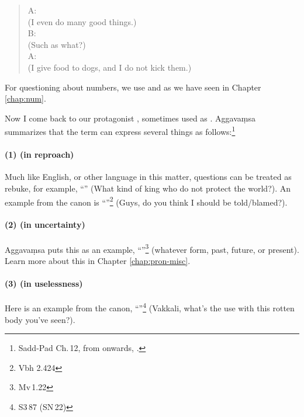 \begin{quote}
A: \\
(I even do many good things.)\\[1.5mm]
B: \\
(Such as what?)\\[1.5mm]
A: \mbox{}\\
(I give food to dogs, and I do not kick them.)\\[1.5mm]
\end{quote}

For questioning about numbers, we use  and  as we have seen in Chapter \ref{chap:num}.

Now I come back to our protagonist , sometimes used as . Aggava\d msa summarizes that the term can express several things as follows:\footnote{Sadd-Pad Ch.\,12, from  onwards, \citealp[p.~279]{smith:sadd1}.}

\paragraph*{(1)  (in reproach)}\label{par:kim} Much like English, or other language in this matter, questions can be treated as rebuke, for example, ``'' (What kind of king who do not protect the world?). An example from the canon is ``''\footnote{Vbh 2.424} (Guys, do you think I should be told/blamed?).

\paragraph*{(2)  (in uncertainty)} Aggava\d msa puts this as an example, ``''\footnote{Mv\,1.22} (whatever form, past, future, or present). Learn more about this in Chapter \ref{chap:pron-misc}.

\paragraph*{(3)  (in uselessness)} Here is an example from the canon, ``''\footnote{S3\,87 (SN\,22)} (Vakkali, what's the use with this rotten body you've seen?).

